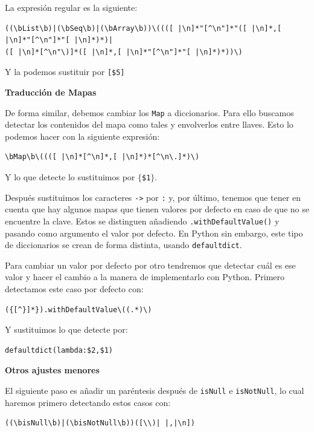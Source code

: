 \documentclass[12pt,twoside,titlepage]{report}
\begin{document}
La expresión regular es la siguiente:

\begin{Verbatim}[fontsize=\scriptsize,frame=single]
((\bList\b)|(\bSeq\b)|(\bArray\b))\((([ |\n]*"[^\n"]*"([ |\n]*,[ |\n]*"[^\n"]*"[ |\n]*)*)|
([ |\n]*[^\n"\)]*([ |\n]*,[ |\n]*"[^\n"]*"[ |\n]*)*))\)
\end{Verbatim}

Y la podemos sustituir por \texttt{[\$5]}


\textbf{Traducción de Mapas}

De forma similar, debemos cambiar los \texttt{Map} a diccionarios. Para ello buscamos detectar los contenidos del mapa como tales y envolverlos entre llaves. Esto lo podemos hacer con la siguiente expresión:

\begin{lstlisting}
\bMap\b\((([ |\n]*[^\n]*,[ |\n]*)*[^\n\.]*)\)
\end{lstlisting}

Y lo que detecte lo sustituimos por \texttt{$\lbrace$\$1$\rbrace$}.

Después sustituimos los caracteres \texttt{->} por \texttt{:} y, por último, tenemos que tener en cuenta que hay algunos mapas que tienen valores por defecto en caso de que no se encuentre la clave. Estos se distinguen añadiendo \texttt{.withDefaultValue()} y pasando como argumento el valor por defecto. En Python sin embargo, este tipo de diccionarios se crean de forma distinta, usando \texttt{defaultdict}.

Para cambiar un valor por defecto por otro tendremos que detectar cuál es ese valor y hacer el cambio a la manera de implementarlo con Python. Primero detectamos este caso por defecto con:

\begin{lstlisting}
({[^}]*}).withDefaultValue\((.*)\)
\end{lstlisting}

Y sustituimos lo que detecte por:

\begin{lstlisting}
defaultdict(lambda:$2,$1)
\end{lstlisting}


\textbf{Otros ajustes menores}

El siguiente paso es añadir un paréntesis después de \texttt{isNull} e \texttt{isNotNull}, lo cual haremos primero detectando estos casos con:

\begin{lstlisting}
((\bisNull\b)|(\bisNotNull\b))([\\)| |,|\n])
\end{lstlisting}
\end{document}
